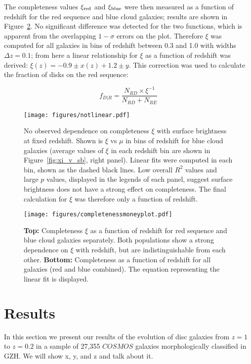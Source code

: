 The completeness values $\rm \xi_{red}$ and $\rm \xi_{blue}$ were then measured as a function of redshift for the red sequence and blue cloud  galaxies; results are shown in Figure~\ref{fig:xi}. No significant difference was detected for the two functions, which is apparent from the overlapping $1-\sigma$ errors on the plot. Therefore $\xi$ was computed for all galaxies in bins of redshift between 0.3 and 1.0 with widths $\Delta z = 0.1$; from here a linear relationship for $\xi$ as a function of redshift was derived: $\xi(z) = -0.9 \pm x (z) + 1.2 \pm y$. This correction was used to calculate the fraction of disks on the red sequence:

\begin{equation}
f_{D|R}=\frac{N_{RD}\times \xi^{-1}}{N_{RD} + N_{RE}}
\label{eqn:frid}
\end{equation}

\begin{figure}
\centering
\texttt{[image: figures/notlinear.pdf]}
\caption{No observed dependence on completeness $\xi$ with surface brightness at fixed redshift. Shown is $\xi$ vs $\mu$ in bins of redshift for blue cloud galaxies (average values of $\xi$ in each redshift bin are shown in Figure~\ref{fig:xi_v_sb}, right panel). Linear fits were computed in each bin, shown as the dashed black lines. Low overall $R^2$ values and large $p$ values, displayed in the legends of each panel, suggest surface brightness does not have a strong effect on completeness. The final calculation for $\xi$ was therefore only a function of redshift.  }

\label{fig:notlinear}
\end{figure}


\begin{figure}
\centering
\texttt{[image: figures/completenessmoneyplot.pdf]}
\caption{\textbf{Top:} Completeness $\xi$ as a function of redshift for red sequence and blue cloud  galaxies separately. Both populations show a strong dependence on $\xi$ with redshift, but are indistinguishable from each other. \textbf{Bottom:} Completeness as a function of redshift for all   galaxies (red and blue combined). The equation representing the linear fit is displayed.}
\label{fig:xi}
\end{figure}

\section{Results}
\label{sec:results}
In this section we present our results of the evolution of disc galaxies from $z=1$ to $z=0.2$ in a sample of 27,355 $COSMOS$ galaxies morphologically classified in GZH. We will show x, y, and z and talk about it. 

